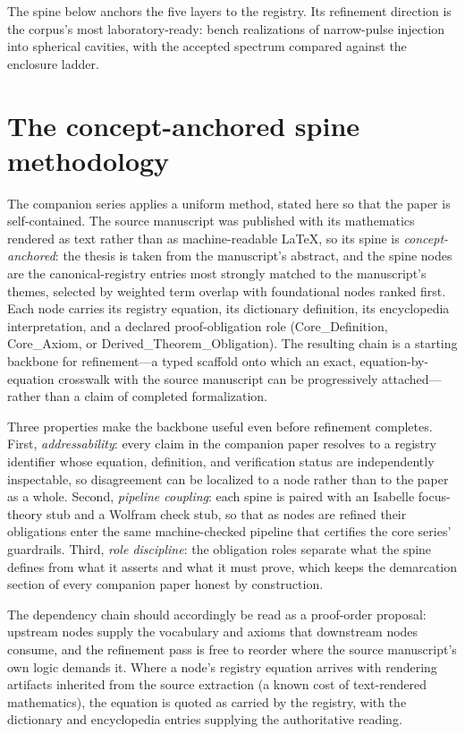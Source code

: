 \documentclass[11pt]{article}
\theoremstyle{remark}
\begin{document}
The spine below anchors the five layers to the registry. Its refinement direction is the corpus's most laboratory-ready: bench realizations of narrow-pulse injection into spherical cavities, with the accepted spectrum compared against the enclosure ladder.

\section{The concept-anchored spine methodology}
\label{sec:method}

The companion series applies a uniform method, stated here so that the paper is self-contained. The source manuscript was published with its mathematics rendered as text rather than as machine-readable LaTeX, so its spine is \emph{concept-anchored}: the thesis is taken from the manuscript's abstract, and the spine nodes are the canonical-registry entries most strongly matched to the manuscript's themes, selected by weighted term overlap with foundational nodes ranked first. Each node carries its registry equation, its dictionary definition, its encyclopedia interpretation, and a declared proof-obligation role (Core\_Definition, Core\_Axiom, or Derived\_Theorem\_Obligation). The resulting chain is a starting backbone for refinement---a typed scaffold onto which an exact, equation-by-equation crosswalk with the source manuscript can be progressively attached---rather than a claim of completed formalization.

Three properties make the backbone useful even before refinement completes. First, \emph{addressability}: every claim in the companion paper resolves to a registry identifier whose equation, definition, and verification status are independently inspectable, so disagreement can be localized to a node rather than to the paper as a whole. Second, \emph{pipeline coupling}: each spine is paired with an Isabelle focus-theory stub and a Wolfram check stub, so that as nodes are refined their obligations enter the same machine-checked pipeline that certifies the core series' guardrails. Third, \emph{role discipline}: the obligation roles separate what the spine defines from what it asserts and what it must prove, which keeps the demarcation section of every companion paper honest by construction.

The dependency chain should accordingly be read as a proof-order proposal: upstream nodes supply the vocabulary and axioms that downstream nodes consume, and the refinement pass is free to reorder where the source manuscript's own logic demands it. Where a node's registry equation arrives with rendering artifacts inherited from the source extraction (a known cost of text-rendered mathematics), the equation is quoted as carried by the registry, with the dictionary and encyclopedia entries supplying the authoritative reading.
\end{document}
